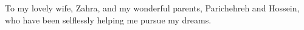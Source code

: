 
\begin{center}
To my lovely wife, Zahra, and my wonderful parents, Parichehreh and Hossein, who have been selflessly helping me pursue my dreams.
\end{center}
